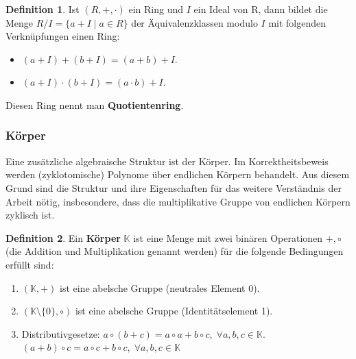 \documentclass[12pt,oneside]{article}
\theoremstyle{remark}
\theoremstyle{definition}
\newtheorem{definition}{Definition}[section]
\begin{document}
\smallskip 

\begin{definition}
Ist $(R, +, \cdot)$ ein Ring und $I$ ein Ideal von R, dann bildet die Menge $R/I = \{ a + I \mid a \in R\}$ der Äquivalenzklassen modulo $I$ mit folgenden Verknüpfungen einen Ring:
\begin{itemize}
    \item $(a + I) + (b + I) = (a + b) + I$.
    \item $(a + I) \cdot (b + I) = (a \cdot b ) + I$.\newline
\end{itemize}
Diesen Ring nennt man \textbf{Quotientenring}. 
\end{definition}

\smallskip






\smallskip

\subsubsection{Körper}
Eine zusätzliche algebraische Struktur ist der Körper. Im Korrektheitsbeweis werden (zyklotomische) Polynome über endlichen Körpern behandelt. Aus diesem Grund sind die Struktur und ihre Eigenschaften für das weitere Verständnis der Arbeit nötig, insbesondere, dass die multiplikative Gruppe von endlichen Körpern zyklisch ist. 

\begin{definition}\label{field_axioms}
Ein \textbf{Körper} $\mathbb{K}$ ist eine Menge mit zwei binären Operationen $+,\circ$ (die Addition und Multiplikation genannt werden) für die folgende Bedingungen erfüllt sind:
\begin{enumerate}
    \item $(\mathbb{K},+)$ ist eine abelsche Gruppe (neutrales Element 0).
    
    \item $(\mathbb{K}\setminus \{ 0\}, \circ)$ ist eine abelsche Gruppe (Identitätselement 1).
    
    \item Distributivgesetze:\newline
        $a \circ (b + c) = a \circ a + b \circ c, \; \forall a,b,c \in \mathbb{K}$.\newline
        $(a + b) \circ c = a \circ c + b \circ c, \; \forall a,b,c \in \mathbb{K}$
\end{enumerate}
\end{definition}
\end{document}
